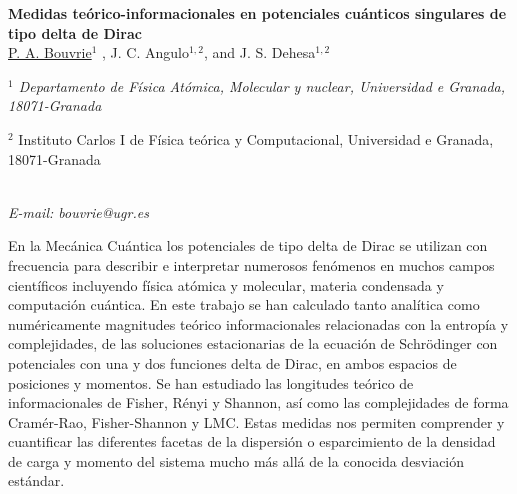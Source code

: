 \newpage
\setcounter{figure}{0}
\begin{center}
{\bf \Large
Medidas teórico-informacionales en potenciales cuánticos singulares de tipo
delta de Dirac}
\\
\vspace{0.5cm}
\underline{P. A. Bouvrie}$^{1}$ , J. C. Angulo$^{1,2}$, and J. S. Dehesa$^{1,2}$
\\
\vspace{0.5cm}
{\it 
$^{1}$ Departamento de Física Atómica, Molecular y nuclear, Universidad e Granada, 18071-Granada

$^{2}$ Instituto Carlos I de Física teórica y Computacional, Universidad e Granada, 18071-Granada
}
\\
\vspace{0.5cm}
{\it E-mail: bouvrie@ugr.es}
\\
\vspace{0.5cm}
\end{center}
En la Mecánica Cuántica los potenciales de tipo delta de Dirac se utilizan con frecuencia
para describir e interpretar numerosos fenómenos en muchos
campos científicos incluyendo física
atómica y molecular, materia condensada y computación cuántica. En este trabajo se han calculado tanto analítica como numéricamente magnitudes teórico informacionales relacionadas con la entropía y complejidades, de las soluciones estacionarias de la ecuación de Schrödinger con potenciales con una y dos funciones delta de Dirac, en ambos espacios de posiciones y momentos. Se han estudiado las longitudes teórico de informacionales de Fisher, Rényi y Shannon, así como las complejidades de forma Cramér-Rao, Fisher-Shannon y LMC.
Estas medidas nos permiten comprender y cuantificar las diferentes
facetas de la dispersión o esparcimiento de la densidad de carga
y momento del sistema mucho más allá de la conocida desviación estándar.
\newpage
\setcounter{figure}{0}

